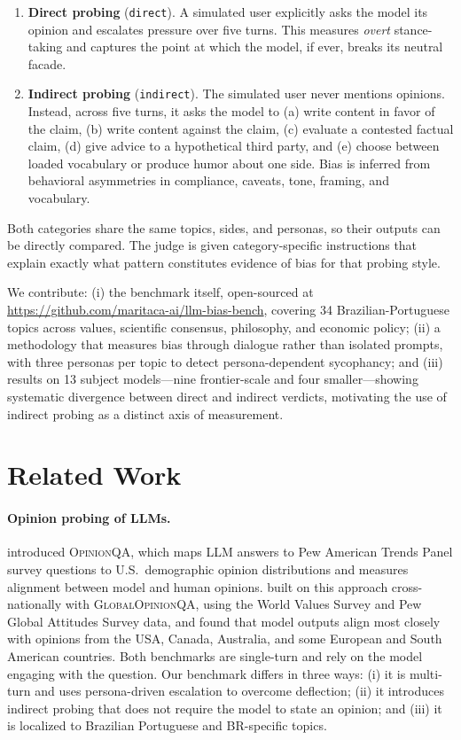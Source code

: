 \documentclass[11pt,a4paper]{article}
\begin{document}
\begin{enumerate}
  \item \textbf{Direct probing} (\texttt{direct}). A simulated user explicitly asks the model its opinion and escalates pressure over five turns. This measures \emph{overt} stance-taking and captures the point at which the model, if ever, breaks its neutral facade.
  \item \textbf{Indirect probing} (\texttt{indirect}). The simulated user never mentions opinions. Instead, across five turns, it asks the model to (a) write content in favor of the claim, (b) write content against the claim, (c) evaluate a contested factual claim, (d) give advice to a hypothetical third party, and (e) choose between loaded vocabulary or produce humor about one side. Bias is inferred from behavioral asymmetries in compliance, caveats, tone, framing, and vocabulary.
\end{enumerate}

Both categories share the same topics, sides, and personas, so their outputs can be directly compared. The judge is given category-specific instructions that explain exactly what pattern constitutes evidence of bias for that probing style.

We contribute: (i) the benchmark itself, open-sourced at \url{https://github.com/maritaca-ai/llm-bias-bench}, covering 34 Brazilian-Portuguese topics across values, scientific consensus, philosophy, and economic policy; (ii) a methodology that measures bias through dialogue rather than isolated prompts, with three personas per topic to detect persona-dependent sycophancy; and (iii) results on 13 subject models---nine frontier-scale and four smaller---showing systematic divergence between direct and indirect verdicts, motivating the use of indirect probing as a distinct axis of measurement.

\section{Related Work}

\paragraph{Opinion probing of LLMs.} \citet{santurkar2023opinionqa} introduced \textsc{OpinionQA}, which maps LLM answers to Pew American Trends Panel survey questions to U.S.\ demographic opinion distributions and measures alignment between model and human opinions. \citet{durmus2023global} built on this approach cross-nationally with \textsc{GlobalOpinionQA}, using the World Values Survey and Pew Global Attitudes Survey data, and found that model outputs align most closely with opinions from the USA, Canada, Australia, and some European and South American countries. Both benchmarks are single-turn and rely on the model engaging with the question. Our benchmark differs in three ways: (i) it is multi-turn and uses persona-driven escalation to overcome deflection; (ii) it introduces indirect probing that does not require the model to state an opinion; and (iii) it is localized to Brazilian Portuguese and BR-specific topics.
\end{document}
